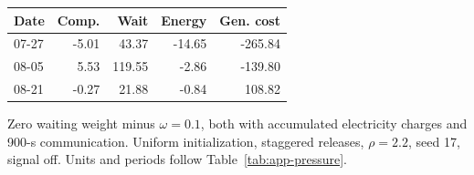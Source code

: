\par\medskip\Needspace{109pt}
\noindent\begin{minipage}{\textwidth}
\centering\footnotesize\setlength{\tabcolsep}{3pt}\renewcommand{\arraystretch}{1.13}
\label{tab:app-sensitivity}
\begin{tabular*}{\textwidth}{@{\extracolsep{\fill}}lrrrr@{}}
\toprule
Date & Comp. & Wait & Energy & Gen. cost\\
\midrule
07-27 & -5.01 & 43.37 & -14.65 & -265.84\\
08-05 & 5.53 & 119.55 & -2.86 & -139.80\\
08-21 & -0.27 & 21.88 & -0.84 & 108.82\\
\bottomrule\end{tabular*}
\par\smallskip\raggedright Zero waiting weight minus $\omega=0.1$, both with accumulated electricity charges and 900-s communication. Uniform initialization, staggered releases, $\rho=2.2$, seed 17, signal off. Units and periods follow Table~\ref{tab:app-pressure}.
\end{minipage}\par\medskip
